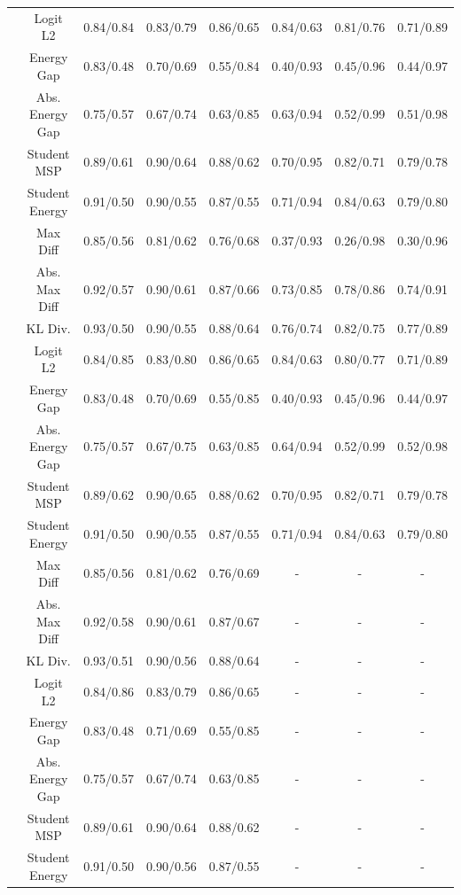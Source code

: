 \documentclass[border=2pt]{standalone}
\begin{document}
\begin{tabular}{cccccccc}
 & Logit L2 & 0.84/0.84 & 0.83/0.79 & 0.86/0.65 & 0.84/0.63 & 0.81/0.76 & 0.71/0.89 \\
 & Energy Gap & 0.83/0.48 & 0.70/0.69 & 0.55/0.84 & 0.40/0.93 & 0.45/0.96 & 0.44/0.97 \\
 & Abs. Energy Gap & 0.75/0.57 & 0.67/0.74 & 0.63/0.85 & 0.63/0.94 & 0.52/0.99 & 0.51/0.98 \\
 & Student MSP & 0.89/0.61 & 0.90/0.64 & 0.88/0.62 & 0.70/0.95 & 0.82/0.71 & 0.79/0.78 \\
 & Student Energy & 0.91/0.50 & 0.90/0.55 & 0.87/0.55 & 0.71/0.94 & 0.84/0.63 & 0.79/0.80 \\
\addlinespace
500 & Max Diff & 0.85/0.56 & 0.81/0.62 & 0.76/0.68 & 0.37/0.93 & 0.26/0.98 & 0.30/0.96 \\
 & Abs. Max Diff & 0.92/0.57 & 0.90/0.61 & 0.87/0.66 & 0.73/0.85 & 0.78/0.86 & 0.74/0.91 \\
 & KL Div. & 0.93/0.50 & 0.90/0.55 & 0.88/0.64 & 0.76/0.74 & 0.82/0.75 & 0.77/0.89 \\
 & Logit L2 & 0.84/0.85 & 0.83/0.80 & 0.86/0.65 & 0.84/0.63 & 0.80/0.77 & 0.71/0.89 \\
 & Energy Gap & 0.83/0.48 & 0.70/0.69 & 0.55/0.85 & 0.40/0.93 & 0.45/0.96 & 0.44/0.97 \\
 & Abs. Energy Gap & 0.75/0.57 & 0.67/0.75 & 0.63/0.85 & 0.64/0.94 & 0.52/0.99 & 0.52/0.98 \\
 & Student MSP & 0.89/0.62 & 0.90/0.65 & 0.88/0.62 & 0.70/0.95 & 0.82/0.71 & 0.79/0.78 \\
 & Student Energy & 0.91/0.50 & 0.90/0.55 & 0.87/0.55 & 0.71/0.94 & 0.84/0.63 & 0.79/0.80 \\
\addlinespace
1000 & Max Diff & 0.85/0.56 & 0.81/0.62 & 0.76/0.69 & - & - & - \\
 & Abs. Max Diff & 0.92/0.58 & 0.90/0.61 & 0.87/0.67 & - & - & - \\
 & KL Div. & 0.93/0.51 & 0.90/0.56 & 0.88/0.64 & - & - & - \\
 & Logit L2 & 0.84/0.86 & 0.83/0.79 & 0.86/0.65 & - & - & - \\
 & Energy Gap & 0.83/0.48 & 0.71/0.69 & 0.55/0.85 & - & - & - \\
 & Abs. Energy Gap & 0.75/0.57 & 0.67/0.74 & 0.63/0.85 & - & - & - \\
 & Student MSP & 0.89/0.61 & 0.90/0.64 & 0.88/0.62 & - & - & - \\
 & Student Energy & 0.91/0.50 & 0.90/0.56 & 0.87/0.55 & - & - & - \\
\bottomrule
\end{tabular}
\end{document}
